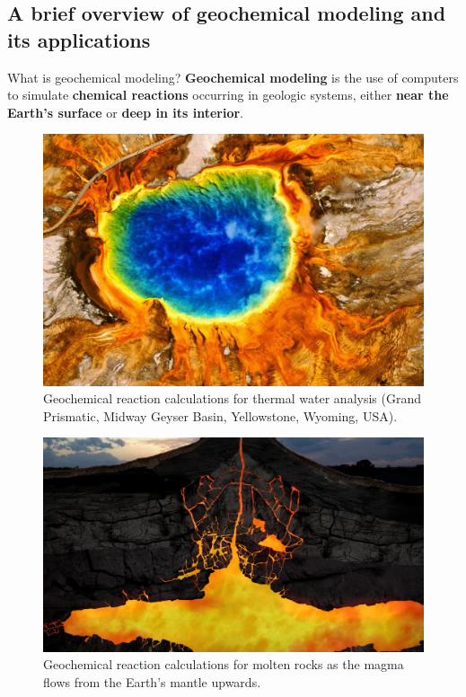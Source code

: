 \subsection{A brief overview of geochemical modeling and its applications}
%
\begin{frame}{What is geochemical modeling?}
\vskip 10pt
 \textbf{Geochemical modeling} is the use of computers to simulate \textbf{chemical
reactions} occurring in geologic systems, either \textbf{near the
Earth's surface} or \textbf{deep in its interior}.
%
\lcol
\begin{singlespace}
%
\begin{figure}
\centering
\includegraphics[height=0.5\columnwidth]{figures/applications/example-of-geochemical-reactions-in-yellowstone-geysers}
\caption*{Geochemical reaction calculations for thermal water analysis 
(Grand Prismatic, Midway Geyser Basin, Yellowstone, Wyoming, USA).}
\end{figure}
%
\end{singlespace}
%
\rcol
\begin{figure}
\vskip 5pt
\centering
\includegraphics[height=0.5\columnwidth]{figures/applications/example-of-geochemical-reactions-in-a-volcano-magma-chamber}
\caption*{Geochemical reaction calculations for molten rocks as the magma flows
from the Earth's mantle upwards.}
\end{figure}
\ecol
\end{frame}

